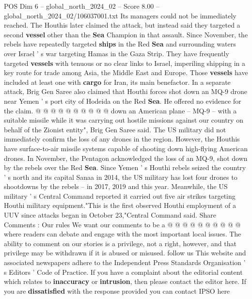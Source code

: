 \begin{textsample}{POS Dim 6 – global\_north\_2024\_02 – Score 8.00 – global\_north\_2024\_02/106037001.txt}
Its managers could not be immediately reached.
The Houthis later claimed the attack, but instead said they targeted a second \textbf{vessel} other than the \textbf{Sea} Champion in that assault.
Since November, the rebels have repeatedly targeted \textbf{ships} in the Red \textbf{Sea} and surrounding waters over Israel ' s war targeting Hamas in the Gaza Strip.
They have frequently targeted \textbf{vessels} with tenuous or no clear links to Israel, imperiling shipping in a key route for trade among Asia, the Middle East and Europe.
Those \textbf{vessels} have included at least one with \textbf{cargo} for Iran, its main benefactor.
In a separate attack, Brig Gen Saree also claimed that Houthi forces shot down an MQ-9 drone near Yemen ' s port city of Hodeida on the Red \textbf{Sea}.
He offered no evidence for the claim. @ @ @ @ @ @ @ @ @ @ down an American plane -- MQ-9 -- with a suitable missile while it was carrying out hostile missions against our country on behalf of the Zionist entity", Brig Gen Saree said.
The US military did not immediately confirm the loss of any drones in the region.
However, the Houthis have surface-to-air missile systems capable of shooting down high-flying American drones.
In November, the Pentagon acknowledged the loss of an MQ-9, shot down by the rebels over the Red \textbf{Sea}.
Since Yemen ' s Houthi rebels seized the country ' s north and its capital Sanaa in 2014, the US military has lost four drones to shootdowns by the rebels -- in 2017, 2019 and this year.
Meanwhile, the US military ' s Central Command reported it carried out five air strikes targeting Houthi military equipment."This is the first observed Houthi employment of a UUV since attacks began in October 23,"Central Command said.
Share Comments : Our rules We want our comments to be a @ @ @ @ @ @ @ @ @ @ where readers can debate and engage with the most important local issues.
The ability to comment on our stories is a privilege, not a right, however, and that privilege may be withdrawn if it is abused or misused. follow us This website and associated newspapers adhere to the Independent Press Standards Organisation ' s Editors ' Code of Practice.
If you have a complaint about the editorial content which relates to \textbf{inaccuracy} or \textbf{intrusion}, then please contact the editor here.
If you are \textbf{dissatisfied} with the response provided you can contact IPSO here

\end{textsample}
